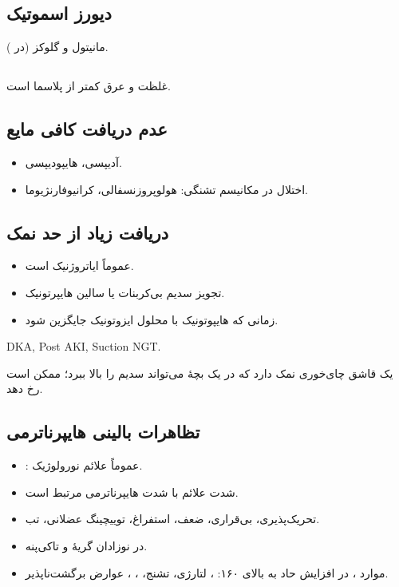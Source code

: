 \documentclass[12pt,a4paper]{article}
\begin{document}
\subsection*{دیورز اسموتیک}
مانیتول و گلوکز (در ).
\subsection*{}
غلظت  و  عرق کمتر از پلاسما است.

\subsection*{عدم دریافت کافی مایع}
\begin{itemize}
\item آدیپسی، هایپودیپسی.
\item اختلال در مکانیسم تشنگی: هولوپروزنسفالی، کرانیوفارنژیوما.
\end{itemize}
\subsection*{دریافت زیاد از حد نمک}
\begin{itemize}
\item عموماً ایاتروژنیک است.
\item تجویز سدیم بی‌کربنات یا سالین هایپرتونیک.
\item زمانی که  هایپوتونیک با محلول ایزوتونیک جایگزین شود.
\end{itemize}
\begin{latin}
DKA, Post AKI, Suction NGT.
\end{latin}
یک قاشق چای‌خوری نمک  دارد که در یک بچهٔ  می‌تواند سدیم را  بالا ببرد؛  ممکن است رخ دهد.
\subsection*{تظاهرات بالینی هایپرناترمی}
\begin{itemize}
\item {}: عموماً علائم نورولوژیک.
\item شدت علائم با شدت هایپرناترمی مرتبط است.
\item تحریک‌پذیری، بی‌قراری، ضعف، استفراغ، توییچینگ عضلانی، تب. 
\item در نوزادان گریهٔ  و تاکی‌پنه.
\item موارد ، در افزایش حاد به بالای ۱۶۰: ، لتارژی، تشنج، ، ، عوارض برگشت‌ناپذیر.
\end{itemize}
\end{document}

